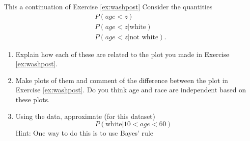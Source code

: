\begin{exercise}

This a continuation of Exercise \ref{ex:washpost}
Consider the quantities
\begin{align*}
&P(age <z)\\
&P(age <z|\text{white})\\
&P(age <z|\text{not white}).
\end{align*}
\begin{enumerate}[label=(\alph*)]
\item Explain how each of these are related to the plot you made in Exercise \ref{ex:washpost}. 
\item Make plots of them and comment of the difference between the plot in Exercise \ref{ex:washpost}. Do you think age and race are independent based on these plots. 
\item Using the data, approximate (for this dataset) 
\begin{equation*}
P(\text{white}| 10<age<60)
\end{equation*}
Hint: One way to do this is to use Bayes' rule 
\end{enumerate}

\end{exercise}


